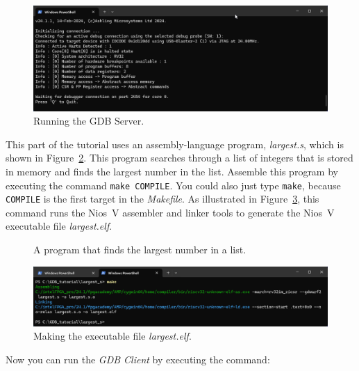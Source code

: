\documentclass[11pt, twoside, pdftex]{article}
\begin{document}
{\begin{figure}[h]
    \begin{center}
        \includegraphics[scale=.55]{figures/server.png}
        \caption{Running the GDB Server.}
        \label{fig:server}
    \end{center}
\end{figure}

This part of the tutorial uses an assembly-language program, {\it largest.s}, which is shown 
in Figure~\ref{fig:largest_code}. This program searches through a list of integers that is 
stored in memory and finds the largest number in the list. Assemble this program by 
executing the command \texttt{make COMPILE}.
You could also just type \texttt{make}, because \texttt{COMPILE} is the first target in the 
{\it Makefile}. As illustrated in Figure~\ref{fig:make_largest}, this command runs the Nios~V
assembler and linker tools to generate the Nios~V executable file {\it largest.elf}.

\begin{figure}[H]

	\caption{A program that finds the largest number in a list.}
	\label{fig:largest_code}
\end{figure}

\begin{figure}[h]
    \begin{center}
        \includegraphics[scale=.55]{figures/make_largest.png}
        \caption{Making the executable file {\it largest.elf}.}
        \label{fig:make_largest}
    \end{center}
\end{figure}

Now you can run the {\it GDB Client} by executing the command:

}
\end{document}
